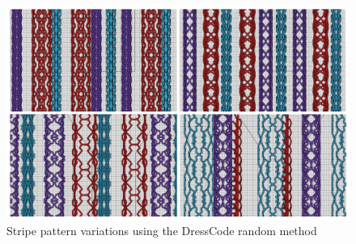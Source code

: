  \begin{center}
\begin{figure}[h!]
\includegraphics[width=6.5in]{images/random_symmetry.png}
\caption{Stripe pattern variations using the DressCode random method }
\label{fig:random_symmetry}
\end{figure}
\end{center}
